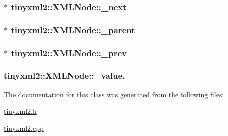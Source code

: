 \subsubsection[{\+\_\+next}]{$\ast$ tinyxml2\+::\+X\+M\+L\+Node\+::\+\_\+next\hspace{0.3cm}{\ttfamily [protected]}}\label{classtinyxml2_1_1_x_m_l_node_a27e985496b37dd00eb5b9cf59b9e3fb1}
\hypertarget{classtinyxml2_1_1_x_m_l_node_a176dd1c4965c21c366de192164aa2c13}{}
\subsubsection[{\+\_\+parent}]{$\ast$ tinyxml2\+::\+X\+M\+L\+Node\+::\+\_\+parent\hspace{0.3cm}{\ttfamily [protected]}}\label{classtinyxml2_1_1_x_m_l_node_a176dd1c4965c21c366de192164aa2c13}
\hypertarget{classtinyxml2_1_1_x_m_l_node_a9739eb0fb9a1188266052055e7a6bf6b}{}
\subsubsection[{\+\_\+prev}]{$\ast$ tinyxml2\+::\+X\+M\+L\+Node\+::\+\_\+prev\hspace{0.3cm}{\ttfamily [protected]}}\label{classtinyxml2_1_1_x_m_l_node_a9739eb0fb9a1188266052055e7a6bf6b}
\hypertarget{classtinyxml2_1_1_x_m_l_node_a3ea9884098b8379de2bb5ab3fc85c0fc}{}
\subsubsection[{\+\_\+value}]{ tinyxml2\+::\+X\+M\+L\+Node\+::\+\_\+value\hspace{0.3cm}{\ttfamily [mutable]}, {\ttfamily [protected]}}\label{classtinyxml2_1_1_x_m_l_node_a3ea9884098b8379de2bb5ab3fc85c0fc}


The documentation for this class was generated from the following files\+:\begin{DoxyCompactItemize}
\item 
\hyperlink{tinyxml2_8h}{tinyxml2.\+h}\item 
\hyperlink{tinyxml2_8cpp}{tinyxml2.\+cpp}\end{DoxyCompactItemize}
